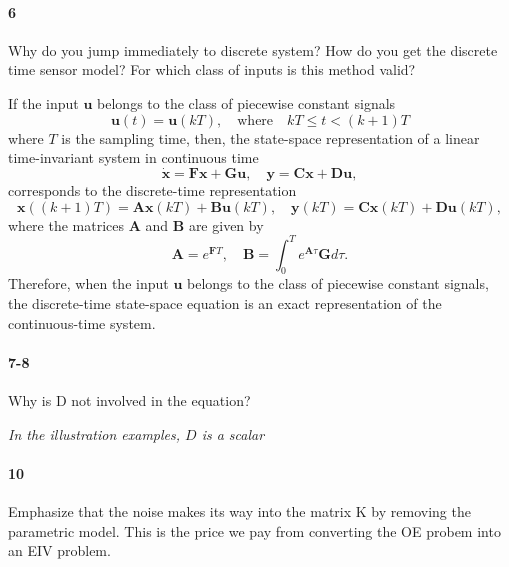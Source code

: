 \documentclass[12pt,english]{article}
\begin{document}
\paragraph{6}
Why do you jump immediately to discrete system? How do you get the discrete time sensor model? For which class of inputs is this method valid?


If the input $\mathbf{u}$ belongs to the class of piecewise constant signals
\begin{equation*} \mathbf{u} (t) = \mathbf{u} (kT), \quad \text{where} \quad kT \leq t < (k+1)T \end{equation*}
where $T$ is the sampling time, then, the state-space representation of a linear time-invariant system in continuous time
\begin{equation*} \dot{ \mathbf{x} } = \mathbf{F} \mathbf{x} + \mathbf{G} \mathbf{u}, \quad \mathbf{y} = \mathbf{C} \mathbf{x} + \mathbf{D} \mathbf{u}, \end{equation*} 
corresponds to the discrete-time representation
\begin{equation*}  \mathbf{x} ((k+1)T) = \mathbf{A} \mathbf{x}(kT) + \mathbf{B} \mathbf{u}(kT), \quad \mathbf{y}(kT) = \mathbf{C} \mathbf{x}(kT) + \mathbf{D} \mathbf{u}(kT) , \end{equation*} 
where the matrices $\mathbf{A}$ and $\mathbf{B}$ are given by 
\begin{equation*}  \mathbf{A}  = e^{\mathbf{F}T}, \quad \mathbf{B} = \int_0^T {e^{\mathbf{A} \tau} \mathbf{G} d \tau}. \end{equation*} 
Therefore, when the input $\mathbf{u}$ belongs to the class of piecewise constant signals, the discrete-time state-space equation is an exact representation of the continuous-time system.


\paragraph{7-8}
Why is D not involved in the equation?

\textit{In the illustration examples, $D$ is a scalar}

\paragraph{10}
Emphasize that the noise makes its way into the matrix K by removing the parametric model. 
This is the price we pay from converting the OE probem into an EIV problem.
\end{document}
